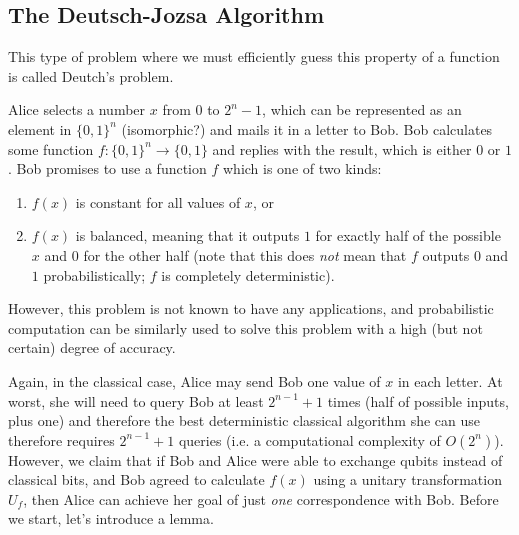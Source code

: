 \documentclass{article}
\newcounter{definition}[section]
\newcounter{algo}[section]
\begin{document}
  \subsection{The Deutsch-Jozsa Algorithm}

    This type of problem where we must efficiently guess this property of a function is called Deutch's problem. 

    \begin{definition}
      \label{def:deutchs-problem}
      Alice selects a number $x$ from $0$ to $2^n - 1$, which can be represented as an element in $\{0, 1\}^n$ (isomorphic?) and mails it in a letter to Bob. Bob calculates some function $f: \{0, 1\}^n \to \{0, 1\}$ and replies with the result, which is either $0$ or $1$. Bob promises to use a function $f$ which is one of two kinds: 
      \begin{enumerate}
        \item $f(x)$ is constant for all values of $x$, or
        \item $f(x)$ is balanced, meaning that it outputs $1$ for exactly half of the possible $x$ and $0$ for the other half (note that this does \textit{not} mean that $f$ outputs $0$ and $1$ probabilistically; $f$ is completely deterministic). 
      \end{enumerate}
    \end{definition}

    However, this problem is not known to have any applications, and probabilistic computation can be similarly used to solve this problem with a high (but not certain) degree of accuracy. 

    Again, in the classical case, Alice may send Bob one value of $x$ in each letter. At worst, she will need to query Bob at least $2^{n-1} + 1$ times (half of possible inputs, plus one) and therefore the best deterministic classical algorithm she can use therefore requires $2^{n-1} + 1$ queries (i.e. a computational complexity of $O(2^n)$). However, we claim that if Bob and Alice were able to exchange qubits instead of classical bits, and Bob agreed to calculate $f(x)$ using a unitary transformation $U_f$, then Alice can achieve her goal of just \textit{one} correspondence with Bob. Before we start, let's introduce a lemma. 
\end{document}
